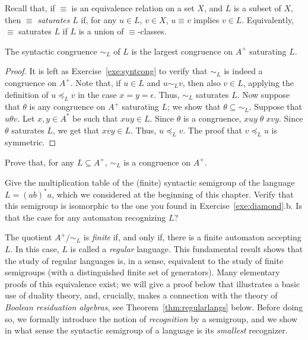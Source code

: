 Recall that, if $\equiv$ is an equivalence relation on a set $X$, and $L$ is a subset of $X$, then $\equiv$ \emph{saturates} $L$ if, for any $u \in L$, $v \in X$, $u \equiv v$ implies $v \in L$. Equivalently, $\equiv$ saturates $L$ if $L$ is a union of $\equiv$-classes.
\begin{proposition}\label{prop:syntcong}
The syntactic congruence $\sim_L$ of $L$ is the largest congruence on $A^+$ saturating $L$.
\end{proposition}
\begin{proof}
  It is left as Exercise~\ref{exe:syntcong} to verify that $\sim_L$ is indeed a congruence on $A^+$. Note that, if $u \in L$ and $u \sim_L v$, then also $v \in L$, applying the definition of $u \preceq_L v$ in the case $x = y = \epsilon$. Thus, $\sim_L$ saturates $L$. %
  Now suppose that $\theta$ is any congruence on $A^+$ saturating $L$; we show that $\theta \subseteq {\sim_L}$. Suppose that $u \theta v$. Let $x, y \in A^*$ be such that $xuy \in L$. Since $\theta$ is a congruence, $x u y \;{\theta}\; x v y$. Since $\theta$ saturates $L$, we get that $x v y \in L$. Thus, $u \preceq_L v$. The proof that $v \preceq_L u$ is symmetric.
\end{proof}
\begin{exercise}\label{exe:syntcong}\easy
Prove that, for any $L \subseteq A^+$, $\sim_L$ is a congruence on $A^+$.
\end{exercise}
\begin{exercise}\label{exe:syntsemexa}\medium
Give the multiplication table of the (finite) syntactic semigroup of the language $L = (ab)^*a$, which we considered at the beginning of this chapter. Verify that this semigroup is isomorphic to the one you found in Exercise~\ref{exe:diamond}.b. Is that the case for any automaton recognizing $L$?
\end{exercise}
The quotient $A^+/{\sim_L}$ is \emph{finite} if, and only if, there is a finite automaton accepting $L$. In this case, $L$ is called a \emph{regular} language. This fundamental result shows that the study of regular languages is, in a sense, equivalent to the study of finite semigroups (with a distinguished finite set of generators). Many elementary proofs of this equivalence exist; we will give a proof below that illustrates a basic use of duality theory, and, crucially, makes a connection with the theory of \emph{Boolean residuation algebras}, see Theorem~\ref{thm:regularlangs} below. Before doing so, we formally introduce the notion of \emph{recognition} by a semigroup, and we show in what sense the syntactic semigroup of a language is its \emph{smallest} recognizer.


